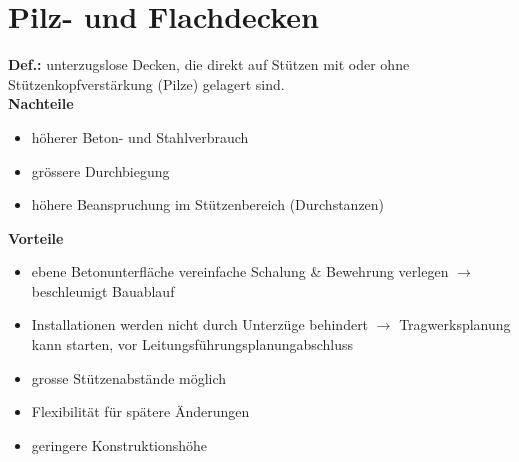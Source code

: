 	
	\begin{minipage}{0.5\linewidth}
		
	\section{Pilz- und Flachdecken}
	
	\textbf{Def.:} unterzugslose Decken, die direkt auf Stützen mit oder ohne Stützenkopfverstärkung (Pilze) gelagert sind. \\
	
	\textbf{Nachteile}
	\begin{itemize}
		
		\item höherer Beton- und Stahlverbrauch
		
		\item grössere Durchbiegung
		
		\item höhere Beanspruchung im Stützenbereich (Durchstanzen)
		
	\end{itemize}

	\end{minipage}
	\begin{minipage}{0.5\linewidth}
		
		
		\textbf{Vorteile}
		\begin{itemize}
			
			\item ebene Betonunterfläche vereinfache Schalung \& Bewehrung verlegen $\rightarrow$ beschleunigt Bauablauf
			
			\item Installationen werden nicht durch Unterzüge behindert $\rightarrow$ Tragwerksplanung kann starten, vor Leitungsführungsplanungabschluss
			
			\item grosse Stützenabstände möglich
			
			\item Flexibilität für spätere Änderungen
			
			\item geringere Konstruktionshöhe 
			
		\end{itemize}			
		
	\end{minipage}




